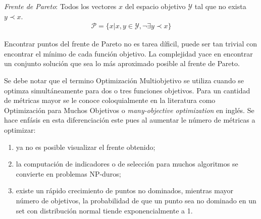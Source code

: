 \textit{Frente de Pareto}: Todos los vectores $x$ del espacio objetivo $\mathcal{Y}$ tal que no exista $y \prec x$.
\begin{align*}
    \mathcal{P} = \{x| x, y \in \mathcal{Y}, \neg \exists y \prec x \} 
\end{align*}

Encontrar puntos del frente de Pareto no es tarea d\'ificil, puede ser tan trivial con encontrar el m\'inimo de cada funci\'on objetivo. La complejidad yace en encontrar un conjunto soluci\'on que sea lo m\'as aproximado posible al frente de Pareto.

Se debe notar que el termino Optimizaci\'on Multiobjetivo se utiliza cuando se optimza simult\'aneamente para dos o tres funciones objetivos. Para un cantidad de m\'etricas mayor se le conoce coloquialmente en la literatura como Optimizaci\'on para Muchos Objetivos o \textit{many-objective optimization} en ingl\'es. Se hace enf\'asis en esta  diferenciaci\'on este pues al aumentar le n\'umero de m\'etricas a optimizar:
\begin{enumerate}
    \item ya no es posible visualizar el frente obtenido;
    \item la computaci\'on de indicadores o de selecci\'on para muchos algoritmos se convierte en problemas NP-duros;
    \item existe un r\'apido crecimiento de puntos no dominados, mientras mayor n\'umero de objetivos, la probabilidad de que un punto sea no dominado en un set con distribuci\'on normal tiende exponencialmente a 1.
\end{enumerate}


